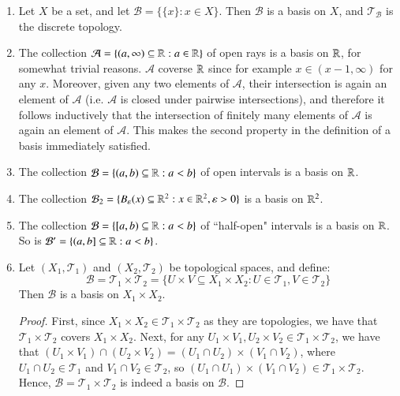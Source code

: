 \documentclass[12pt, a4paper, oneside, openright, titlepage]{book}
\begin{document}
\begin{eg}
    \leavevmode
    \begin{enumerate}
        \item Let $X$ be a set, and let $\mathcal{B} = \{\{x\}:x \in X\}$. Then $\mathcal{B}$ is a basis on $X$, and $\mathcal{T}_{\mathcal{B}}$ is the discrete topology.
        \item The collection $\mathcal{A} = \{(a,\infty)\subseteq \mathbb R:a \in \mathbb R\}$ of open rays is a basis on $\mathbb R$, for somewhat trivial reasons. $\mathcal{A}$ coverse $\mathbb R$ since for example $x \in (x-1,\infty)$ for any $x$. Moreover, given any two elements of $\mathcal{A}$, their intersection is again an element of $\mathcal{A}$ (i.e. $\mathcal{A}$ is closed under pairwise intersections), and therefore it follows inductively that the intersection of finitely many elements of $\mathcal{A}$ is again an element of $\mathcal{A}$. This makes the second property in the definition of a basis immediately satisfied. 
        \item The collection $\mathcal{B} = \{(a,b) \subseteq \mathbb R:a <b\}$ of open intervals is a basis on $\mathbb R$.
        \item The collection $\mathcal{B}_2 = \{B_{\varepsilon}(x) \subseteq \mathbb R^2:x \in \mathbb R^2,\varepsilon > 0\}$ is a basis on $\mathbb R^2$.
        \item The collection $\mathcal{B} = \{[a,b)\subseteq \mathbb R:a < b\}$ of ``half-open" intervals is a basis on $\mathbb R$. So is $\mathcal{B}' = \{(a,b]\subseteq \mathbb R:a<b\}$.
        \item Let $(X_1,\mathcal{T}_1)$ and $(X_2,\mathcal{T}_2)$ be topological spaces, and define: \begin{equation*}
                \mathcal{B} = \mathcal{T}_1\times \mathcal{T}_2 = \{U\times V\subseteq X_1\times X_2: U\in \mathcal{T}_1,V\in\mathcal{T}_2\}
        \end{equation*}
            Then $\mathcal{B}$ is a basis on $X_1\times X_2$.
            \begin{proof}
                First, since $X_1\times X_2 \in \mathcal{T}_1\times \mathcal{T}_2$ as they are topologies, we have that $\mathcal{T}_1\times \mathcal{T}_2$ covers $X_1\times X_2$. Next, for any $U_1\times V_1, U_2\times V_2 \in \mathcal{T}_1\times \mathcal{T}_2$, we have that $(U_1\times V_1)\cap(U_2\times V_2) = (U_1\cap U_2)\times (V_1\cap V_2)$, where $U_1\cap U_2 \in \mathcal{T}_1$ and $V_1\cap V_2 \in \mathcal{T}_2$, so $(U_1\cap U_1)\times (V_1\cap V_2) \in \mathcal{T}_1\times \mathcal{T}_2$. Hence, $\mathcal{B} = \mathcal{T}_1\times \mathcal{T}_2$ is indeed a basis on $\mathcal{B}$.

\end{proof}
\end{enumerate}
\end{eg}
\end{document}
